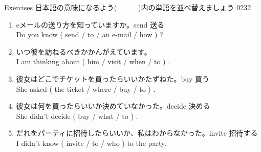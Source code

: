 \documentclass[aspectratio=169,xcolor={dvipsnames,table}]{beamer}
\begin{document}
\begin{frame}[plain]{Exercises}
日本語の意味になるよう(~~~~~~)内の単語を並べ替えましょう%
\hfill{\tiny 0232}\,{\scriptsize {}}

 \begin{enumerate}
  \item eメールの送り方を知っていますか。\hfill{\scriptsize send  送る}\\%
	Do you know ( send / to / an e-mail / how ) ?\hfill{}
	\visible<2->{\textcolor{BurntOrange}{\bfseries how to send an e-mail}}
  \item いつ彼を訪ねるべきかかんがえています。\\
	I am thinking about ( him / visit / when / to ) .\hfill{}
	\visible<3->{\textcolor{BurntOrange}{\bfseries when to visit him}}
  \item 彼女はどこでチケットを買ったらいいかたずねた。\hfill{\scriptsize buy  買う}\\
	She asked ( the ticket / where / buy / to  ) .\hfill{}
	\\
  \item 彼女は何を買ったらいいか決めていなかった。\hfill{\scriptsize decide  決める}\\
	She didn't decide ( buy / what / to ) .
	\hfill\visible<5->{\textcolor{BurntOrange}{\bfseries what to buy}}
  \item だれをパーティに招待したらいいか、私はわからなかった。\hfill{\scriptsize invite  招待する}\\
	I didn't know ( invite / to / who ) to the party.\hfill{}
	\visible<6->{\textcolor{BurntOrange}{\bfseries who to invite}}
 \end{enumerate}
\end{frame}
\end{document}
